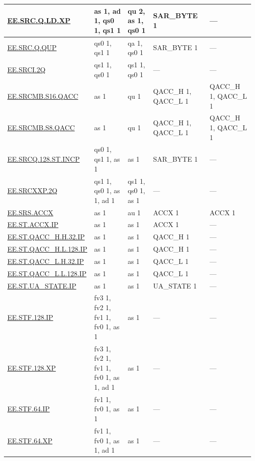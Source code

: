 \begin{longtable}[c]{|l|m{2.5cm}|m{2.5cm}|m{2.5cm}|m{2.5cm}|}
    \hyperref[instruction:EESRCQLDXP]{EE.SRC.Q.LD.XP} & as 1, ad 1, qs0 1, qs1 1 & qu 2, as 1, qs0 1 & SAR\_BYTE 1 & — \\\hline
    \hyperref[instruction:EESRCQQUP]{EE.SRC.Q.QUP} & qs0 1, qs1 1 & qa 1, qs0 1 & SAR\_BYTE 1 & — \\\hline
    \hyperref[instruction:EESRCI2Q]{EE.SRCI.2Q} & qs1 1, qs0 1 & qs1 1, qs0 1 & — & — \\\hline
    \hyperref[instruction:EESRCMBS16QACC]{EE.SRCMB.S16.QACC} & as 1 & qu 1 & QACC\_H 1, QACC\_L 1 & QACC\_H 1, QACC\_L 1\\\hline
    \hyperref[instruction:EESRCMBS8QACC]{EE.SRCMB.S8.QACC} & as 1 & qu 1 & QACC\_H 1, QACC\_L 1 & QACC\_H 1, QACC\_L 1\\\hline
    \hyperref[instruction:EESRCQ128STINCP]{EE.SRCQ.128.ST.INCP} & qs0 1, qs1 1, as 1 & as 1 & SAR\_BYTE 1 & — \\\hline
    \hyperref[instruction:EESRCXXP2Q]{EE.SRCXXP.2Q} & qs1 1, qs0 1, as 1, ad 1 & qs1 1, qs0 1, as 1 & — & — \\\hline
    \hyperref[instruction:EESRSACCX]{EE.SRS.ACCX} & as 1 & au 1 & ACCX 1 & ACCX 1\\\hline
    \hyperref[instruction:EESTACCXIP]{EE.ST.ACCX.IP} & as 1 & as 1 & ACCX 1 & — \\\hline
    \hyperref[instruction:EESTQACCHH32IP]{EE.ST.QACC\_H.H.32.IP} & as 1 & as 1 & QACC\_H 1 & — \\\hline
    \hyperref[instruction:EESTQACCHL128IP]{EE.ST.QACC\_H.L.128.IP} & as 1 & as 1 & QACC\_H 1 & — \\\hline
    \hyperref[instruction:EESTQACCLH32IP]{EE.ST.QACC\_L.H.32.IP} & as 1 & as 1 & QACC\_L 1 & — \\\hline
    \hyperref[instruction:EESTQACCLL128IP]{EE.ST.QACC\_L.L.128.IP} & as 1 & as 1 & QACC\_L 1 & — \\\hline
    \hyperref[instruction:EESTUASTATEIP]{EE.ST.UA\_STATE.IP} & as 1 & as 1 & UA\_STATE 1 & — \\\hline
    \hyperref[instruction:EESTF128IP]{EE.STF.128.IP} & fv3 1, fv2 1, fv1 1, fv0 1, as 1 & as 1 & — & — \\\hline
    \hyperref[instruction:EESTF128XP]{EE.STF.128.XP} & fv3 1, fv2 1, fv1 1, fv0 1, as 1, ad 1 & as 1 & — & — \\\hline
    \hyperref[instruction:EESTF64IP]{EE.STF.64.IP} & fv1 1, fv0 1, as 1 & as 1 & — & — \\\hline
    \hyperref[instruction:EESTF64XP]{EE.STF.64.XP} & fv1 1, fv0 1, as 1, ad 1 & as 1 & — & — \\\hline

\end{longtable}
